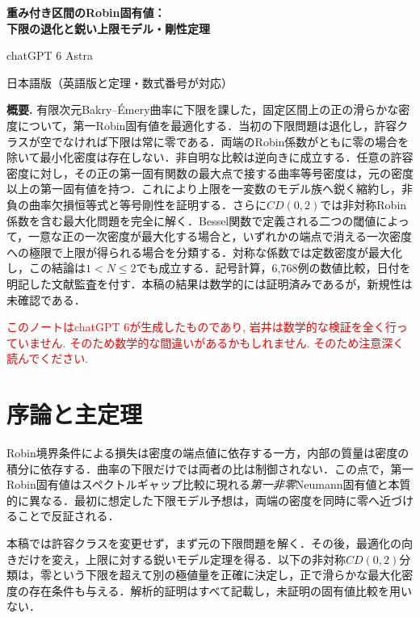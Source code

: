 \documentclass[12pt]{amsart}
\theoremstyle{definition}
\theoremstyle{remark}
\numberwithin{equation}{section}
\newcommand{\xr}[1]{\textcolor{red}{#1}}
\providecommand{\theHthm}{\arabic{section}.\arabic{thm}}
\begin{document}
\newpage
\setcounter{section}{0}
\setcounter{thm}{0}
\setcounter{equation}{0}
\renewcommand{\theHsection}{ja.\arabic{section}}
\renewcommand{\theHequation}{ja.\arabic{section}.\arabic{equation}}
\renewcommand{\theHthm}{ja.\arabic{section}.\arabic{thm}}
\renewcommand{\proofname}{証明}
\begin{center}
{\Large\bfseries 重み付き区間のRobin固有値：\\下限の退化と鋭い上限モデル・剛性定理}\par\medskip
chatGPT 6 Astra\par\smallskip
日本語版（英語版と定理・数式番号が対応）
\end{center}
\noindent\textbf{概要.}
有限次元Bakry--\'Emery曲率に下限を課した，固定区間上の正の滑らかな密度について，第一Robin固有値を最適化する．当初の下限問題は退化し，許容クラスが空でなければ下限は常に零である．両端のRobin係数がともに零の場合を除いて最小化密度は存在しない．非自明な比較は逆向きに成立する．任意の許容密度に対し，その正の第一固有関数の最大点で接する曲率等号密度は，元の密度以上の第一固有値を持つ．これにより上限を一変数のモデル族へ鋭く縮約し，非負の曲率欠損恒等式と等号剛性を証明する．さらに$CD(0,2)$では非対称Robin係数を含む最大化問題を完全に解く．Bessel関数で定義される二つの閾値によって，一意な正の一次密度が最大化する場合と，いずれかの端点で消える一次密度への極限で上限が得られる場合を分類する．対称な係数では定数密度が最大化し，この結論は$1<N\le2$でも成立する．記号計算，6,768例の数値比較，日付を明記した文献監査を付す．本稿の結果は数学的には証明済みであるが，新規性は未確認である．

\xr{このノートはchatGPT 6が生成したものであり, 岩井は数学的な検証を全く行っていません. そのため数学的な間違いがあるかもしれません. そのため注意深く読んでください.}


\section{序論と主定理}
Robin境界条件による損失は密度の端点値に依存する一方，内部の質量は密度の積分に依存する．曲率の下限だけでは両者の比は制御されない．この点で，第一Robin固有値はスペクトルギャップ比較に現れる\emph{第一非零}Neumann固有値と本質的に異なる．最初に想定した下限モデル予想は，両端の密度を同時に零へ近づけることで反証される．

本稿では許容クラスを変更せず，まず元の下限問題を解く．その後，最適化の向きだけを変え，上限に対する鋭いモデル定理を得る．以下の非対称$CD(0,2)$分類は，零という下限を超えて別の極値量を正確に決定し，正で滑らかな最大化密度の存在条件も与える．解析的証明はすべて記載し，未証明の固有値比較を用いない．
\end{document}
